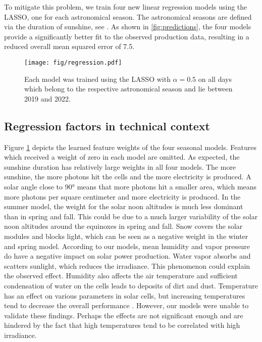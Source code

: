 \documentclass{article}
\begin{document}
To mitigate this problem, we train four new linear regression models using the LASSO, one for each astronomical season. The astronomical seasons are defined via the duration of sunshine, see \cite{MS}. As shown in \ref{fig:predictions}, the four models provide a significantly better fit to the observed production data, resulting in a reduced overall mean squared error of 7.5.

\begin{figure}[H]
	\texttt{[image: fig/regression.pdf]}
	\caption{Each model was trained using the LASSO with $\alpha = 0.5$ on all days which belong to the respective astronomical season and lie between 2019 and 2022.}\label{fig:coefficients}
\end{figure}

\subsection*{Regression factors in technical context}

Figure \ref{fig:coefficients} depicts the learned feature weights of the four seasonal models. Features which received a weight of zero in each model are omitted. As expected, the sunshine duration has relatively large weights in all four models. The more sunshine, the more photons hit the cells and the more electricity is produced. A solar angle close to 90° means that more photons hit a smaller area, which means more photons per square centimeter and more electricity is produced. In the summer model, the weight for the solar noon altitudes is much less dominant than in spring and fall. This could be due to a much larger variability of the solar noon altitudes around the equinoxes in spring and fall. Snow covers the solar modules and blocks light, which can be seen as a negative weight in the winter and spring model. According to our models, mean humidity and vapor pressure do have a negative impact on solar power production. Water vapor absorbs and scatters sunlight, which reduces the irradiance. This phenomenon could explain the observed effect. Humidity also affects the air temperature and sufficient condensation of water on the cells leads to deposits of dirt and dust. Temperature has an effect on various parameters in solar cells, but increasing temperatures tend to decrease the overall performance \cite{SolarAndTemperature}. However, our models were unable to validate these findings. Perhaps the effects are not significant enough and are hindered by the fact that high temperatures tend to be correlated with high irradiance.
\end{document}
